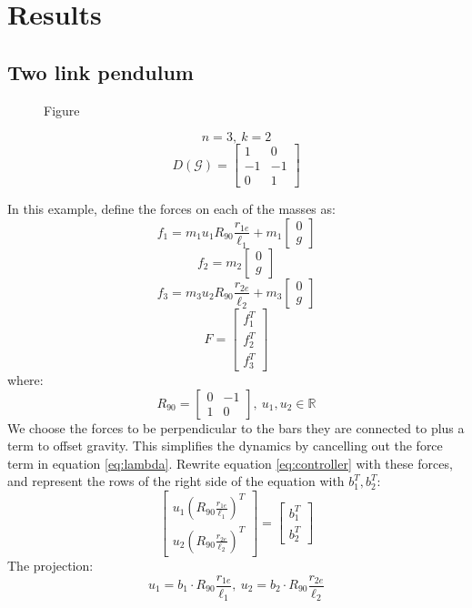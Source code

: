 \documentclass[conference]{IEEEtran}
\begin{document}
\section{Results}
\subsection{Two link pendulum}
\begin{figure}[htbp]
    \centering
    \caption{Figure}
    \label{fig:overp}
\end{figure}
$$n=3,\:k=2$$
$$D(\mathcal{G})=\begin{bmatrix}
    1 & 0\\
    -1 & -1\\
    0 & 1
\end{bmatrix}$$

In this example, define the forces on each of the masses as:
$$f_1=m_1u_1R_{90}\frac{r_{1e}}{\ell_1} + m_1\begin{bmatrix} 0\\ g \end{bmatrix}$$
$$f_2=m_2\begin{bmatrix} 0\\ g \end{bmatrix}$$
$$f_3=m_3u_2R_{90}\frac{r_{2e}}{\ell_2} + m_3\begin{bmatrix} 0\\ g \end{bmatrix}$$
$$F=\begin{bmatrix}
    f_1^T\\ f_2^T\\ f_3^T
\end{bmatrix}$$
where:
$$R_{90}=\begin{bmatrix}
    0 & -1\\ 1 & 0
\end{bmatrix},\:u_1,u_2\in\mathbb{R}$$
We choose the forces to be perpendicular to the bars they are connected to plus a term to offset gravity. This simplifies the dynamics by cancelling out the force term in equation \ref{eq:lambda}. Rewrite equation \ref{eq:controller} with these forces, and represent the rows of the right side of the equation with $b_1^T,b_2^T$:
$$\begin{bmatrix}
    u_1(R_{90}\frac{r_{1e}}{\ell_1})^T\\
    u_2(R_{90}\frac{r_{2e}}{\ell_2})^T
\end{bmatrix}=\begin{bmatrix}
    b_1^T\\ b_2^T
\end{bmatrix}$$
The projection:
$$u_1=b_1\cdot R_{90}\frac{r_{1e}}{\ell_1},\:u_2=b_2\cdot R_{90}\frac{r_{2e}}{\ell_2}$$
\end{document}
